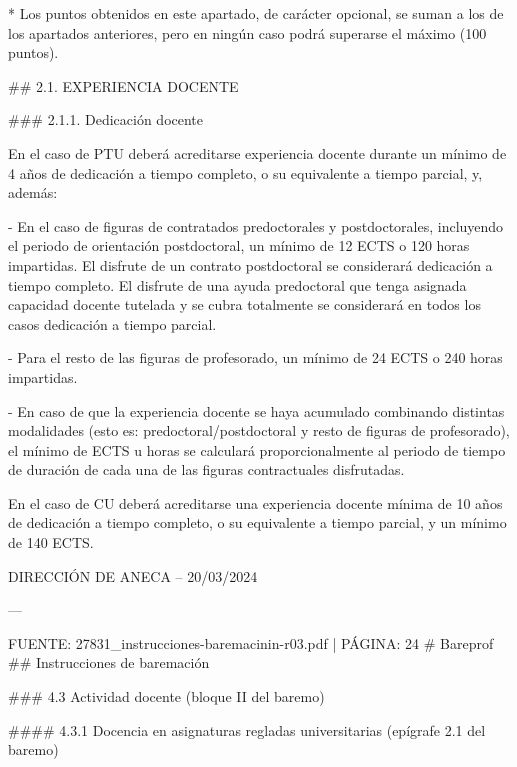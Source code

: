 \documentclass{article}
\begin{document}
\begin{itemize}
\begin{itemize}
\begin{scriptsize}
                  * Los puntos obtenidos en este apartado, de carácter opcional, se suman a los de los apartados anteriores, pero en ningún caso podrá superarse el máximo (100 puntos).

                  \#\# 2.1. EXPERIENCIA DOCENTE

                  \#\#\# 2.1.1. Dedicación docente

                  En el caso de PTU deberá acreditarse experiencia docente durante un mínimo de 4 años de dedicación a tiempo completo, o su equivalente a tiempo parcial, y, además:

                  - En el caso de figuras de contratados predoctorales y postdoctorales, incluyendo el periodo de orientación postdoctoral, un mínimo de 12 ECTS o 120 horas impartidas. El disfrute de un contrato postdoctoral se considerará dedicación a tiempo completo. El disfrute de una ayuda predoctoral que tenga asignada capacidad docente tutelada y se cubra totalmente se considerará en todos los casos dedicación a tiempo parcial.

                  - Para el resto de las figuras de profesorado, un mínimo de 24 ECTS o 240 horas impartidas.

                  - En caso de que la experiencia docente se haya acumulado combinando distintas modalidades (esto es: predoctoral/postdoctoral y resto de figuras de profesorado), el mínimo de ECTS u horas se calculará proporcionalmente al periodo de tiempo de duración de cada una de las figuras contractuales disfrutadas.

                  En el caso de CU deberá acreditarse una experiencia docente mínima de 10 años de dedicación a tiempo completo, o su equivalente a tiempo parcial, y un mínimo de 140 ECTS.

                  DIRECCIÓN DE ANECA – 20/03/2024

                  ---

                  FUENTE: 27831\_instrucciones-baremacinin-r03.pdf | PÁGINA: 24
                  \# Bareprof
                  \#\# Instrucciones de baremación

                  \#\#\# 4.3 Actividad docente (bloque II del baremo)

                  \#\#\#\# 4.3.1 Docencia en asignaturas regladas universitarias (epígrafe 2.1 del baremo)


\end{scriptsize}
\end{itemize}
\end{itemize}
\end{document}
